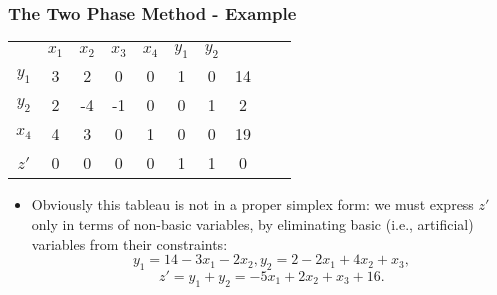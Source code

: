 \documentclass{beamer}
\theoremstyle{plain}
\begin{document}
\begin{frame}\frametitle{The Two Phase Method - Example}
\justifying

\begin{center}

\begin{tabular}{c|cccccc|ccc}	
& $ x_1 $ & $ x_2 $ & $ x_3 $ & $ x_4 $ & $y_1 $ & $ y_2 $  & && \\
\cline{1-8}	
 $ y_1 $ & 3 & 2 & 0 & 0 & 1 & 0 & 14 &   &  \\	
 $ y_2 $ & 2 & -4 & -1 & 0 & 0  & 1 &  2 &  & \\	
$ x_4 $ & 4 & 3 & 0 & 1 & 0 & 0 & 19 & & \\
\cline{1-8}	
$ z' $ & 0 & 0 & 0 & 0 & 1 & 1 & 0  & \\
\end{tabular}
\end{center}

\begin{itemize}
\justifying

\item Obviously this tableau is not in a proper simplex form: we must express $ z' $ only in terms of non-basic variables, by eliminating basic (i.e., artificial) variables from their constraints:
\[ y_1 = 14 - 3x_1 - 2x_2, y_2 = 2 -2x_1 + 4x_2 + x_3, \]
\[ z' = y_1 + y_2 = -5x_1 + 2x_2 + x_3 + 16. \]
\end{itemize}

\end{frame}
\end{document}
